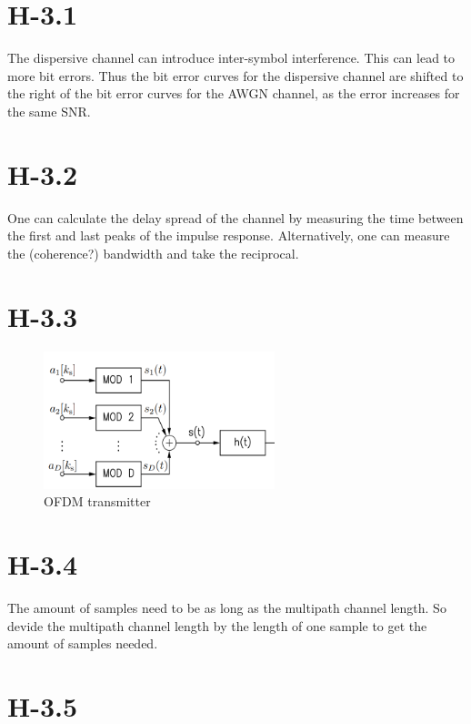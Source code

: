 \documentclass{article}
\begin{document}
\section{H-3.1}

The dispersive channel can introduce inter-symbol interference.
This can lead to more bit errors.
Thus the bit error curves for the dispersive channel are shifted to the right of the bit error curves for the AWGN channel, as the error increases for the same SNR.

\section{H-3.2}

One can calculate the delay spread of the channel by measuring the time between the first and last peaks of the impulse response.
Alternatively, one can measure the (coherence?) bandwidth and take the reciprocal.

\section{H-3.3}

\begin{figure}[h]
\centering
\includegraphics[width=0.6\textwidth]{ofdm_transmitter.png}
\caption{OFDM transmitter}
\label{fig:ofdm_transmitter}
\end{figure}

\section{H-3.4}

The amount of samples need to be as long as the multipath channel length.
So devide the multipath channel length by the length of one sample to get the amount of samples needed.

\section{H-3.5}
\end{document}
